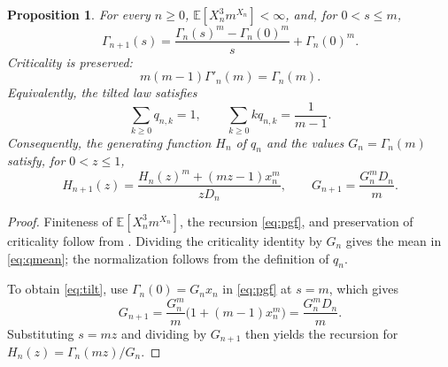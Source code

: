 \documentclass[11pt,letterpaper,reqno]{amsart}
\numberwithin{equation}{section}
\theoremstyle{plain}
\newtheorem{proposition}[theorem]{Proposition}
\theoremstyle{remark}
\newcommand{\E}{\mathbb E}\newcommand{\Pp}{\mathbb P}
\begin{document}
\begin{proposition}\label{prop:pgf}
For every $n\ge0$, $\E[X_n^3m^{X_n}]<\infty$, and, for $0<s\le m$,
\begin{equation}\label{eq:pgf}
 \Gamma_{n+1}(s)=\frac{\Gamma_n(s)^m-\Gamma_n(0)^m}{s}+\Gamma_n(0)^m.
\end{equation}
Criticality is preserved:
\[
 m(m-1)\Gamma'_n(m)=\Gamma_n(m).
\]
Equivalently, the tilted law satisfies
\begin{equation}\label{eq:qmean}
 \sum_{k\ge0}q_{n,k}=1,\qquad \sum_{k\ge0}kq_{n,k}=\frac1{m-1}.
\end{equation}
Consequently, the generating function $H_n$ of $q_n$ and the values $G_n=\Gamma_n(m)$ satisfy, for $0<z\le1$,
\begin{equation}\label{eq:tilt}
 H_{n+1}(z)=\frac{H_n(z)^m+(mz-1)x_n^m}{zD_n},\qquad
 G_{n+1}=\frac{G_n^mD_n}{m}.
\end{equation}
\end{proposition}
\begin{proof}
Finiteness of $\E[X_n^3m^{X_n}]$, the recursion \eqref{eq:pgf}, and preservation of criticality follow from \cite[Section~2.1, eqs.~(7)--(13)]{CDHLS}. Dividing the criticality identity by $G_n$ gives the mean in \eqref{eq:qmean}; the normalization follows from the definition of $q_n$.

To obtain \eqref{eq:tilt}, use $\Gamma_n(0)=G_nx_n$ in \eqref{eq:pgf} at $s=m$, which gives
\[
 G_{n+1}=\frac{G_n^m}{m}\bigl(1+(m-1)x_n^m\bigr)=\frac{G_n^mD_n}{m}.
\]
Substituting $s=mz$ and dividing by $G_{n+1}$ then yields the recursion for $H_n(z)=\Gamma_n(mz)/G_n$.
\end{proof}
\end{document}
